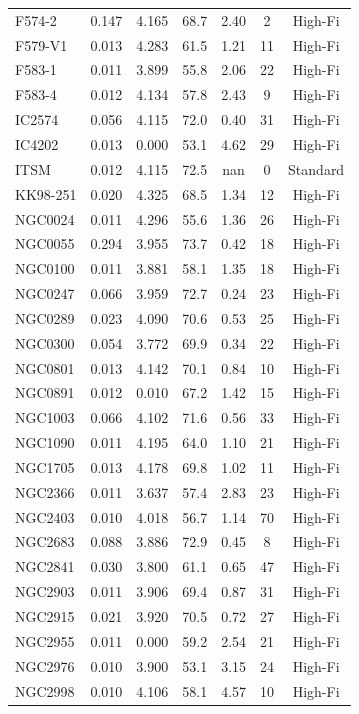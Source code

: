 \begin{longtable}{lcccccc}
F574-2 & 0.147 & 4.165 & 68.7 & 2.40 & 2 & High-Fi \\
F579-V1 & 0.013 & 4.283 & 61.5 & 1.21 & 11 & High-Fi \\
F583-1 & 0.011 & 3.899 & 55.8 & 2.06 & 22 & High-Fi \\
F583-4 & 0.012 & 4.134 & 57.8 & 2.43 & 9 & High-Fi \\
IC2574 & 0.056 & 4.115 & 72.0 & 0.40 & 31 & High-Fi \\
IC4202 & 0.013 & 0.000 & 53.1 & 4.62 & 29 & High-Fi \\
ITSM & 0.012 & 4.115 & 72.5 & nan & 0 & Standard \\
KK98-251 & 0.020 & 4.325 & 68.5 & 1.34 & 12 & High-Fi \\
NGC0024 & 0.011 & 4.296 & 55.6 & 1.36 & 26 & High-Fi \\
NGC0055 & 0.294 & 3.955 & 73.7 & 0.42 & 18 & High-Fi \\
NGC0100 & 0.011 & 3.881 & 58.1 & 1.35 & 18 & High-Fi \\
NGC0247 & 0.066 & 3.959 & 72.7 & 0.24 & 23 & High-Fi \\
NGC0289 & 0.023 & 4.090 & 70.6 & 0.53 & 25 & High-Fi \\
NGC0300 & 0.054 & 3.772 & 69.9 & 0.34 & 22 & High-Fi \\
NGC0801 & 0.013 & 4.142 & 70.1 & 0.84 & 10 & High-Fi \\
NGC0891 & 0.012 & 0.010 & 67.2 & 1.42 & 15 & High-Fi \\
NGC1003 & 0.066 & 4.102 & 71.6 & 0.56 & 33 & High-Fi \\
NGC1090 & 0.011 & 4.195 & 64.0 & 1.10 & 21 & High-Fi \\
NGC1705 & 0.013 & 4.178 & 69.8 & 1.02 & 11 & High-Fi \\
NGC2366 & 0.011 & 3.637 & 57.4 & 2.83 & 23 & High-Fi \\
NGC2403 & 0.010 & 4.018 & 56.7 & 1.14 & 70 & High-Fi \\
NGC2683 & 0.088 & 3.886 & 72.9 & 0.45 & 8 & High-Fi \\
NGC2841 & 0.030 & 3.800 & 61.1 & 0.65 & 47 & High-Fi \\
NGC2903 & 0.011 & 3.906 & 69.4 & 0.87 & 31 & High-Fi \\
NGC2915 & 0.021 & 3.920 & 70.5 & 0.72 & 27 & High-Fi \\
NGC2955 & 0.011 & 0.000 & 59.2 & 2.54 & 21 & High-Fi \\
NGC2976 & 0.010 & 3.900 & 53.1 & 3.15 & 24 & High-Fi \\
NGC2998 & 0.010 & 4.106 & 58.1 & 4.57 & 10 & High-Fi \\

\end{longtable}
